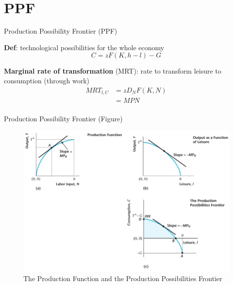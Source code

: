\documentclass[11pt,aspectratio=169,usenames,dvipsnames]{beamer}
\let\tempone\itemize
\let\temptwo\enditemize
\renewenvironment{itemize}{\tempone\addtolength{\itemsep}{\fill}}{\temptwo}
\begin{document}
\section{PPF}
\label{sec:PPF}

\begin{frame}{Production Possibility Frontier (PPF)}
\label{slide:Production_Possibility_Frontier__PPF_}
    \begin{itemize}
        \item \textbf{Def}: technological possibilities for the whole economy
        \begin{equation}
        \label{eq:PPF}
            C = z F( K, h-l ) - G
        \end{equation}
        \item \textbf{Marginal rate of transformation} (MRT): rate to transform leisure to consumption (through work)
        \begin{equation}
        \label{eq:MRT}
            \begin{split}
                MRT_{l, C}
                    & = z D_{N} F( K, N )
                \\
                    & = MPN
                \\
            \end{split}
        \end{equation}
    \end{itemize}
\end{frame}

\begin{frame}{Production Possibility Frontier (Figure)}
\label{slide:Production_Possibility_Frontier__Figure_}
        \begin{figure}
            \caption{\scriptsize The Production Function and the Production Possibilities Frontier}
            \includegraphics[width=.7\textwidth]{./figures/Figure5_2.jpg}
        \end{figure}
\end{frame}
\end{document}
